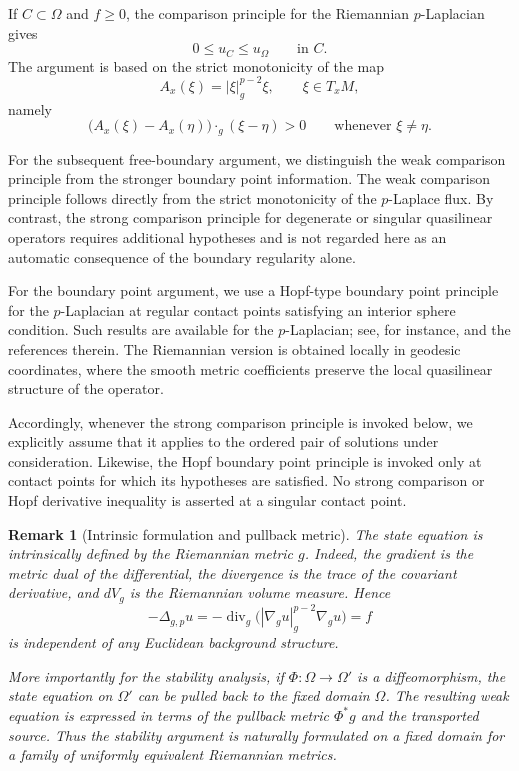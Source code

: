 \documentclass{article}
\newtheorem{remark}[theorem]{Remark}
\begin{document}
If $C\subset\Omega$ and $f\geq0$, the comparison principle for the
Riemannian $p$-Laplacian gives
\[
0\leq u_C\leq u_\Omega
\qquad\text{in }C.
\]
The argument is based on the strict monotonicity of the map
\[
A_x(\xi)=|\xi|_g^{p-2}\xi,
\qquad \xi\in T_xM,
\]
namely
\[
\bigl(A_x(\xi)-A_x(\eta)\bigr)\mathbin{\cdot_g}(\xi-\eta)>0
\qquad\text{whenever }\xi\neq\eta.
\]

For the subsequent free-boundary argument, we distinguish the
weak comparison principle from the stronger boundary point information.
The weak comparison principle follows directly from the strict
monotonicity of the $p$-Laplace flux. By contrast, the strong comparison
principle for degenerate or singular quasilinear operators requires
additional hypotheses and is not regarded here as an automatic
consequence of the boundary regularity alone.

For the boundary point argument, we use a Hopf-type boundary point
principle for the $p$-Laplacian at regular contact points satisfying an
interior sphere condition. Such results are available for the
$p$-Laplacian; see, for instance,
\cite{MikayelyanShahgholian2015} and the references therein.
The Riemannian version is obtained locally in geodesic coordinates,
where the smooth metric coefficients preserve the local quasilinear
structure of the operator.

Accordingly, whenever the strong comparison principle is invoked below,
we explicitly assume that it applies to the ordered pair of solutions
under consideration. Likewise, the Hopf boundary point principle is
invoked only at contact points for which its hypotheses are satisfied.
No strong comparison or Hopf derivative inequality is asserted at a
singular contact point.


\begin{remark}[Intrinsic formulation and pullback metric]
The state equation is intrinsically defined by the Riemannian metric
$g$. Indeed, the gradient is the metric dual of the differential, the
divergence is the trace of the covariant derivative, and $dV_g$ is the
Riemannian volume measure. Hence
\[
-\Delta_{g,p}u
=-\operatorname{div}_g\bigl(|\nabla_g u|_g^{p-2}\nabla_g u\bigr)=f
\]
is independent of any Euclidean background structure.

More importantly for the stability analysis, if
$\Phi:\Omega\to\Omega'$ is a diffeomorphism, the state equation on
$\Omega'$ can be pulled back to the fixed domain $\Omega$. The
resulting weak equation is expressed in terms of the pullback metric
$\Phi^*g$ and the transported source. Thus the stability argument is
naturally formulated on a fixed domain for a family of uniformly
equivalent Riemannian metrics.
\end{remark}
\end{document}
